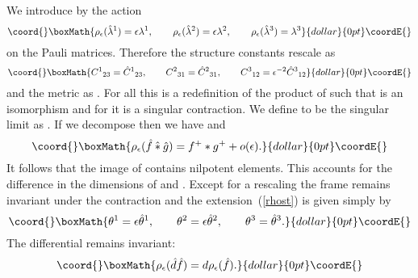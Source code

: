 \documentclass[a4paper,12pt]{article}
\def\h#1{\hat #1}
\def\c#1{{\cal #1}}
\def\wm{\mathbin{*}}
\def\hwm{\mathbin{\hat *}}
\begin{document}
We introduce \myHighlight{$\rho_\epsilon$}\coordHE{} by the action
$$\coord{}\boxMath{
\rho_\epsilon (\h{\lambda^1}) = \epsilon \lambda^1, \qquad
\rho_\epsilon (\h{\lambda^2}) = \epsilon \lambda^2, \qquad
\rho_\epsilon (\h{\lambda^3}) = \lambda^3
}{dollar}{0pt}\coordE{}$$
on the Pauli matrices. Therefore the structure constants rescale as
$$\coord{}\boxMath{
C^1{}_{23} = \h{C}^1{}_{23}, \qquad 
C^2{}_{31} = \h{C}^2{}_{31}, \qquad
C^3{}_{12} = \epsilon^{-2} \h{C}^3{}_{12}
}{dollar}{0pt}\coordE{}$$
and the metric as \coordHE{}.
For all \coordHE{} this is a redefinition of the product of
\coordHE{} such that \myHighlight{$\rho_\epsilon$}\coordHE{} is an isomorphism and for 
\coordHE{} it is a singular contraction.  We define \coordHE{} to be
the singular limit as \coordHE{}. If we decompose 
\myHighlight{$\h{f} = \h{f}^+ + \h{f}^-$}\coordHE{} then we have 
\myHighlight{$\rho_\epsilon(\h{f}) = f^+ + \epsilon f^-$}\coordHE{} and
$$\coord{}\boxMath{
\rho_\epsilon(\h{f} \hwm \h{g}) = f^+ \wm g^+ + o(\epsilon).
}{dollar}{0pt}\coordE{}$$
It follows that the image of \coordHE{} contains nilpotent elements. This
accounts for the difference in the dimensions of \myHighlight{$\h{\c{A}}$}\coordHE{} and \myHighlight{$\c{A}$}\coordHE{}.
Except for a rescaling the frame remains invariant under the
contraction and the extension~(\ref{rhost}) is given simply by
$$\coord{}\boxMath{
\theta^1 = \epsilon \h{\theta}^1, \qquad
\theta^2 = \epsilon \h{\theta}^2, \qquad
\theta^3 = \h{\theta}^3.
}{dollar}{0pt}\coordE{}$$
The differential remains invariant: 
$$\coord{}\boxMath{
\rho_\epsilon (\h{d}\h{f}) = d \rho_\epsilon(\h{f}).
}{dollar}{0pt}\coordE{}$$
\end{document}
